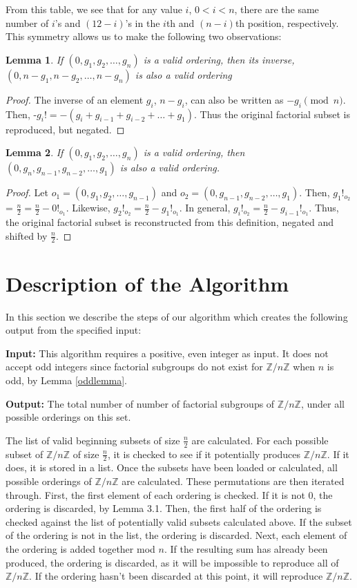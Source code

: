 \documentclass{article}
\newcommand{\ZZ}{\mathbb{Z}}
\newcommand{\ZnZ}{\ZZ/n\ZZ}
\newtheorem{lemma}{Lemma}
\begin{document}
From this table, we see that for any value $i$, $0<i<n$, there are the same number of $i$'s and $(12-i)$'s in the $i$th and $(n-i)$th position, respectively. This symmetry allows us to make the following two observations:
\begin{lemma}
If $(0,g_1,g_2,\ldots,g_n)$ is a valid ordering, then its inverse, $(0, n-g_1, n-g_2, \ldots, n-g_n)$ is also a valid ordering
\end{lemma}
\begin{proof}
The inverse of an element $g_i$, $n-g_i$, can also be written as $-g_i\pmod{n}$. Then, -$g_i! = -(g_i + g_{i-1} + g_{i-2} + \ldots + g_1)$. Thus the original factorial subset is reproduced, but negated. 
\end{proof}
\begin{lemma}
If $(0, g_1, g_2, \ldots, g_n)$ is a valid ordering, then $(0, g_n, g_{n-1}, g_{n-2}, \ldots, g_1)$ is also a valid ordering.
\end{lemma}
\begin{proof}
Let $o_1 = (0,g_1, g_2, \ldots, g_{n-1})$ and $o_2 = (0, g_{n-1}, g_{n-2}, \ldots, g_1)$. Then, $g_1!_{o_2}$ = $\frac{n}{2} = \frac{n}{2} - 0!_{o_1}$. Likewise, $g_2!_{o_2} = \frac{n}{2}-g_1!_{o_1}$. In general, $g_i!_{o_2} = \frac{n}{2} - g_{i-1}!_{o_1}$. Thus, the original factorial subset is reconstructed from this definition, negated and shifted by $\frac{n}{2}$.  
\end{proof}

\section{Description of the Algorithm}

In this section we describe the steps of our algorithm which creates the following output from the specified input:

\noindent\textbf{Input:} This algorithm requires a positive, even integer as input. It does not accept odd integers since factorial subgroups do not exist for $\ZnZ$ when $n$ is odd, by Lemma \ref{oddlemma}.

\noindent\textbf{Output:} The total number of number of factorial subgroups of $\ZnZ$, under all possible orderings on this set.

The list of valid beginning subsets of size $\frac{n}{2}$ are calculated. For each possible subset of $\ZnZ$ of size $\frac{n}{2}$, it is checked to see if it potentially produces $\ZnZ$. If it does, it is stored in a list. Once the subsets have been loaded or calculated, all possible orderings of $\ZnZ$ are calculated. These permutations are then iterated through. First, the first element of each ordering is checked. If it is not 0, the ordering is discarded, by Lemma 3.1. Then, the first half of the ordering is checked against the list of potentially valid subsets calculated above. If the subset of the ordering is not in the list, the ordering is discarded. Next, each element of the ordering is added together mod $n$. If the resulting sum has already been produced, the ordering is discarded, as it will be impossible to reproduce all of $\ZnZ$. If the ordering hasn't been discarded at this point, it will reproduce $\ZnZ$.
\end{document}

